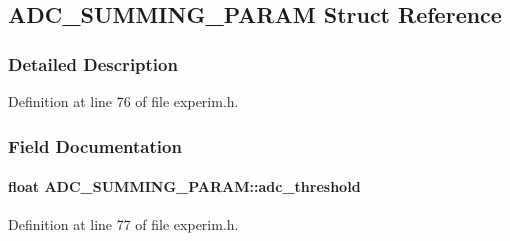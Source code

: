 \subsection{ADC\_\-SUMMING\_\-PARAM Struct Reference}
\label{structADC__SUMMING__PARAM}


\subsubsection{Detailed Description}


Definition at line 76 of file experim.h.

\subsubsection{Field Documentation}
\paragraph[{adc\_\-threshold}]{\setlength{\rightskip}{0pt plus 5cm}float {\bf ADC\_\-SUMMING\_\-PARAM::adc\_\-threshold}}\hfill\label{structADC__SUMMING__PARAM_a0d8449fe3119e8f0c79e9398fd788295}


Definition at line 77 of file experim.h.